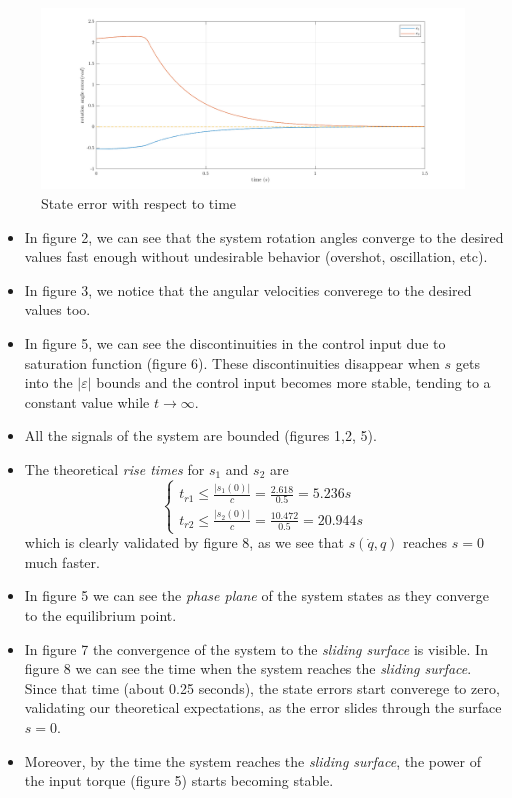 \documentclass[a4paper]{article}
\begin{document}
\begin{figure}[H]
    \centering
    \includegraphics[width=15cm]{fig/sim1/e.png}
    \caption{State error with respect to time}
\end{figure}

\noindent\hspace{-2pt}
\begin{itemize}
    \item In figure 2, we can see that the system rotation angles converge to the desired values fast enough without undesirable behavior (overshot, oscillation, etc).
    \item In figure 3, we notice that the angular velocities converege to the desired values too. 
    \item In figure 5, we can see the discontinuities in the control input due to saturation function (figure 6). These discontinuities disappear when $s$ gets into 
    the $|\varepsilon|$ bounds and the control input becomes more stable, tending to a constant value while $t \rightarrow \infty$. 
    \item All the signals of the system are bounded (figures 1,2, 5).
    \item The theoretical \textit{rise times} for $s_1$ and $s_2$ are 
    $$  \begin{cases}
            t_{r1} \le \frac{|s_1(0)|}{c} = \frac{2.618}{0.5} = 5.236 s\\
            t_{r2} \le \frac{|s_2(0)|}{c} = \frac{10.472}{0.5} = 20.944 s
        \end{cases} 
    $$
    which is clearly validated by figure 8, as we see that $s(\dot{q}, q)$ reaches $s=0$ much faster.
    \item In figure 5 we can see the \textit{phase plane} of the system states as they converge to the equilibrium point.
    \item In figure 7 the convergence of the system to the \textit{sliding surface} is visible. In figure 8 we can see the time 
    when the system reaches the \textit{sliding surface}. Since that time (about 0.25 seconds), the state errors start converege 
    to zero, validating our theoretical expectations, as the error slides through the surface $s=0$.
    \item Moreover, by the time the system reaches the \textit{sliding surface}, the power of the input torque (figure 5) starts 
    becoming stable.
\end{itemize}
\end{document}
